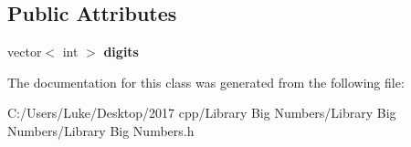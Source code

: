 \subsection*{Public Attributes}
\begin{DoxyCompactItemize}
\item 
\mbox{\label{class_library_big_numbers_1_1_big_numbers_ae550a59baff8ecb4c7dc43afb69a1333}} 
vector$<$ int $>$ {\bfseries digits}
\end{DoxyCompactItemize}


The documentation for this class was generated from the following file\+:\begin{DoxyCompactItemize}
\item 
C\+:/\+Users/\+Luke/\+Desktop/2017 cpp/\+Library Big Numbers/\+Library Big Numbers/Library Big Numbers.\+h\end{DoxyCompactItemize}
